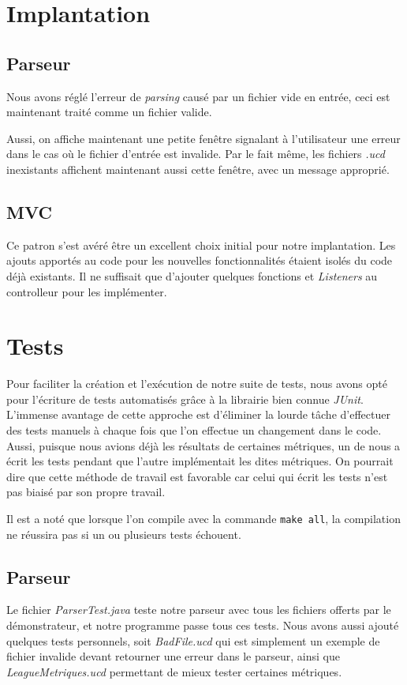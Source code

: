 \documentclass[letter,french]{report}
\begin{document}
	\section*{Implantation}
	
	\subsection*{Parseur}
  Nous avons réglé l'erreur de \emph{parsing} causé par un fichier vide en
  entrée, ceci est maintenant traité comme un fichier valide.

  Aussi, on affiche
  maintenant une petite fenêtre signalant à l'utilisateur une erreur dans
  le cas où le fichier d'entrée est invalide. Par le fait même, les fichiers
  \emph{.ucd} inexistants affichent maintenant aussi cette fenêtre, avec un message
  approprié.
	
	\subsection*{MVC}
  Ce patron s'est avéré être un excellent choix initial pour notre implantation.
  Les ajouts apportés au code pour les nouvelles fonctionnalités étaient isolés
  du code déjà existants. Il ne suffisait que d'ajouter quelques fonctions et
  \emph{Listeners} au controlleur pour les implémenter.

	\section*{Tests}
  Pour faciliter la création et l'exécution de notre suite de tests, nous avons opté pour
  l'écriture de tests automatisés grâce à la librairie bien connue \emph{JUnit}.
  L'immense avantage de cette approche est d'éliminer la lourde tâche
  d'effectuer des tests manuels à chaque fois que l'on effectue un changement
  dans le code. Aussi, puisque nous avions déjà les résultats de certaines
  métriques, un de nous a écrit les tests pendant que l'autre implémentait les
  dites métriques. On pourrait dire que cette méthode de travail est favorable
  car celui qui écrit les tests n'est pas biaisé par son propre travail.

  Il est a noté que lorsque l'on compile avec la commande \texttt{make all}, la
  compilation ne réussira pas si un ou plusieurs tests échouent. 

  \subsection*{Parseur}
  Le fichier \emph{ParserTest.java} teste notre parseur avec tous les fichiers
  offerts par le démonstrateur, et notre programme passe tous ces tests. Nous
  avons aussi ajouté quelques tests personnels, soit \emph{BadFile.ucd} qui est
  simplement un exemple de fichier invalide devant retourner une erreur dans le
  parseur, ainsi que \emph{LeagueMetriques.ucd} permettant de mieux tester
  certaines métriques.
\end{document}
